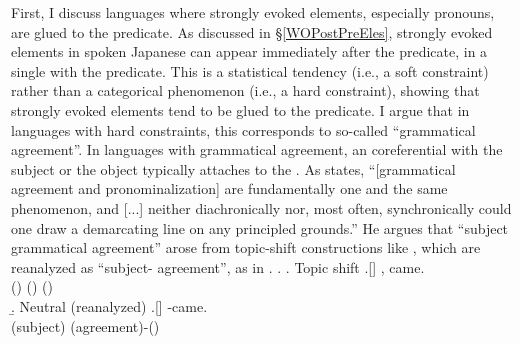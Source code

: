 First, I discuss languages where strongly evoked elements, especially pronouns, are glued to the predicate.
As discussed in \S \ref{WOPostPreEles},
strongly evoked elements in spoken Japanese can appear immediately after the predicate, in a single  with the predicate.
This is a statistical tendency (i.e., a soft constraint) rather than a categorical phenomenon (i.e., a hard constraint),
showing that strongly evoked elements tend to be glued to the predicate.
I argue that in languages with hard constraints,
this corresponds to so-called ``grammatical agreement''.
In languages with grammatical agreement,
an  coreferential with the subject or the object typically attaches to the .
As  states,
``[grammatical agreement and pronominalization] are fundamentally one and the same phenomenon, and [...] neither diachronically nor, most often, synchronically could one draw a demarcating line on any principled grounds.''
He argues that ``subject grammatical agreement'' arose from topic-shift constructions like \Next[a],
which are reanalyzed as ``subject- agreement'', as in \Next[b].
%
\ex.\label{Disc:HardConst:Integrated:Ex:TS}
 \a. Topic shift
 \bg.[] ,  came. \\
        () () () \\
 \b. Neutral (reanalyzed)
 \bg.[]  -came. \\
        (subject) (agreement)-() \\
 \hfill{\cite[155]{givon76}}


